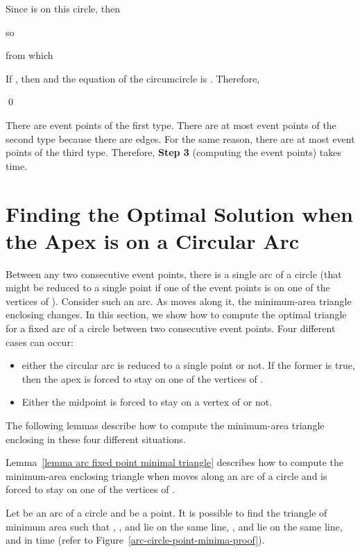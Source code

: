 \documentclass[11pt, oneside]{article}
\begin{document}
Since  is on this circle,
then

so

from which


If ,
then  and the equation of the circumcircle is .
Therefore,

\qed

There are  event points of the first type.
There are at most  event points of the second type
because there are  edges.
For the same reason,
there are at most  event points of the third type.
Therefore,
{\bf Step 3} 
(computing the event points)
takes  time.




\section{Finding the Optimal Solution when the Apex is on a Circular Arc}
\label{section optimal solution apex on circular arc}




Between any two consecutive event points,
there is a single arc of a circle
(that might be reduced to a single point
if one of the event points is on one of the vertices of ).
Consider such an arc.
As  moves along it,
the minimum-area triangle enclosing  changes.
In this section,
we show how to compute the optimal triangle
for a fixed arc of a circle
between two consecutive event points.
Four different cases can occur:
\begin{itemize}
\item either the circular arc is reduced to a single point or not.
If the former is true,
then the apex  is forced to stay on one of the vertices of .

\item Either the midpoint  is forced to stay on a vertex of  or not.
\end{itemize}
The following lemmas describe how to compute 
the minimum-area triangle enclosing 
in these four different situations.

Lemma~\ref{lemma arc fixed point minimal triangle}
describes how to compute the minimum-area enclosing triangle
when  moves along an arc of a circle
and  is forced to stay on one of the vertices of .
\begin{lemma}
\label{lemma arc fixed point minimal triangle}
Let  be an arc of a circle
and  be a point.
It is possible to find the triangle 
of minimum area such that ,
,  and  lie on the same line,
,  and  lie on the same line,
and 
in  time
(refer to Figure~\ref{arc-circle-point-minima-proof}).
\end{lemma}
\end{document}
